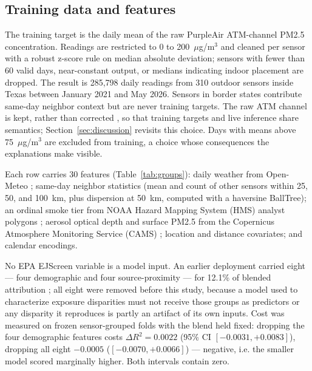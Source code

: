 \documentclass[conference]{IEEEtran}
\newcommand{\ugm}{$\mu$g/m$^3$}
\begin{document}
\subsection{Training data and features}
The training target is the daily mean of the raw PurpleAir ATM-channel
PM2.5 concentration. Readings are restricted to 0 to 200~\ugm{} and
cleaned per sensor with a robust z-score rule on median absolute
deviation; sensors with fewer than 60 valid days, near-constant output, or
medians indicating indoor placement are dropped. The result is 285,798 daily
readings from 310 outdoor sensors inside Texas between January 2021 and May
2026. Sensors in border states contribute same-day neighbor context but are
never training targets. The raw ATM channel is kept, rather than corrected
\cite{barkjohn2021}, so that training targets and live inference share
semantics; Section~\ref{sec:discussion} revisits this choice. Days with
means above 75~\ugm{} are excluded
from training, a choice whose consequences the explanations make visible.

Each row carries 30 features (Table~\ref{tab:groups}): daily weather from
Open-Meteo \cite{zippenfenig}; same-day neighbor statistics (mean and
count of other sensors within 25, 50, and 100~km, plus dispersion at
50~km, computed with a haversine BallTree); an ordinal smoke tier from
NOAA Hazard Mapping System (HMS) analyst polygons \cite{brey2018}; aerosol optical depth and surface PM2.5
from the Copernicus Atmosphere Monitoring Service (CAMS) \cite{peuch2022};
location and distance covariates; and calendar encodings.

No EPA EJScreen variable is a model input. An earlier deployment carried
eight --- four demographic and four source-proximity --- for 12.1\% of
blended attribution \cite{ejscreen}; all eight were removed before this study,
because a model used to characterize exposure disparities must not receive
those groups as predictors or any disparity it reproduces is partly an
artifact of its own inputs. Cost was measured on frozen sensor-grouped folds
with the blend held fixed: dropping the four demographic features costs
$\Delta R^2 = 0.0022$ (95\% CI $[-0.0031,+0.0083]$), dropping all eight
$-0.0005$ ($[-0.0070,+0.0066]$) --- negative, i.e. the smaller model scored
marginally higher. Both intervals contain zero.
\end{document}
